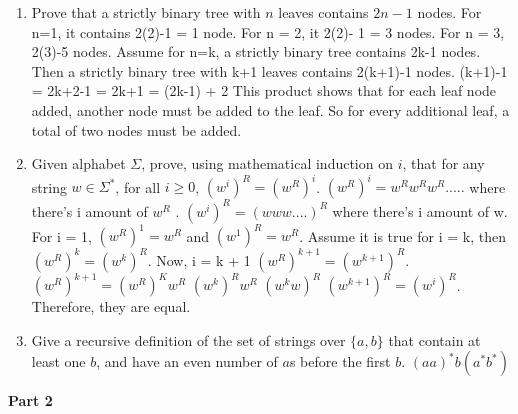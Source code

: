 \documentclass{article}
\begin{document}
\begin{enumerate}
\item Prove that a strictly binary tree with $n$ leaves contains $2n
  -1$ nodes.
  \newline For n=1, it contains 2(2)-1 = 1 node. For n = 2, it 2(2)- 1 = 3 nodes.  For n = 3, 2(3)-5 nodes. Assume for n=k, a strictly binary tree contains 2k-1 nodes. Then a strictly binary tree with k+1 leaves contains 2(k+1)-1 nodes.
  (k+1)-1 = 2k+2-1
  \newline = 2k+1
  \newline = (2k-1) + 2
  \newline This product shows that for each leaf node added, another node must be added to the leaf. So for every additional leaf, a total of two nodes  must be added.

\item Given alphabet $\Sigma$, prove, using mathematical induction on $i$,
that for any string $w \in \Sigma^*$, for all $i \geq 0$, $(w^i)^R =
(w^R)^i$.
\newline $(w^R)^i = w^Rw^Rw^R.....$ where there's i amount of $w^R$ . $(w^i)^R = (www....)^R$ where there's i amount of w.
\newline For i = 1, $(w^R)^1 = w^R$ and $(w^1)^R = w^R$.  Assume it is true for i = k, then $(w^R)^k = (w^k)^R$. Now, i = k + 1 $(w^R)^{k+1} = (w^{k+1})^R$.
\newline $(w^R)^{k+1} = (w^R)^Kw^R$
\newline $(w^k)^Rw^R$
\newline $(w^kw)^R$
\newline $(w^{k+1})^R = (w^i)^R$. Therefore, they are equal.

\item Give a recursive definition of the set of strings over $\{a,
  b\}$ that contain at least one $b$, and have an even number of $a$s
  before the first $b$.
\newline $(aa)^*b(a^*b^*)$
\end{enumerate}

\newpage

\begin{center}
    \textbf{Part 2}
\end{center}
\end{document}
